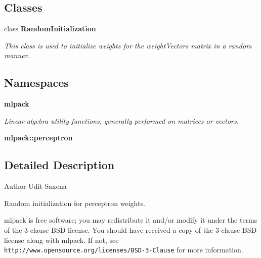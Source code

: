 \subsection*{Classes}
\begin{DoxyCompactItemize}
\item 
class \textbf{ Random\+Initialization}
\begin{DoxyCompactList}\small\item\em This class is used to initialize weights for the weight\+Vectors matrix in a random manner. \end{DoxyCompactList}\end{DoxyCompactItemize}
\subsection*{Namespaces}
\begin{DoxyCompactItemize}
\item 
 \textbf{ mlpack}
\begin{DoxyCompactList}\small\item\em Linear algebra utility functions, generally performed on matrices or vectors. \end{DoxyCompactList}\item 
 \textbf{ mlpack\+::perceptron}
\end{DoxyCompactItemize}


\subsection{Detailed Description}
\begin{DoxyAuthor}{Author}
Udit Saxena
\end{DoxyAuthor}
Random initialization for perceptron weights.

mlpack is free software; you may redistribute it and/or modify it under the terms of the 3-\/clause B\+SD license. You should have received a copy of the 3-\/clause B\+SD license along with mlpack. If not, see {\tt http\+://www.\+opensource.\+org/licenses/\+B\+S\+D-\/3-\/\+Clause} for more information. 